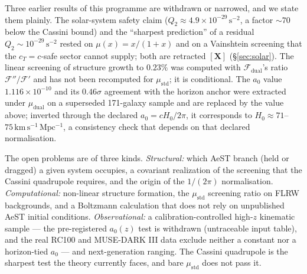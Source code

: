 \documentclass[aps,prd,preprint,superscriptaddress,nofootinbib,amsmath,amssymb,floatfix]{revtex4-2}
\makeatletter
\DeclareRobustCommand{\_}{%
    \ifmmode\nfss@text{\textunderscore}\else\textunderscore\penalty\z@\fi}%
\makeatother
\begin{document}
Three earlier results of this programme are withdrawn or narrowed, and we state them plainly. The solar-system safety claim ($Q_2 \approx 4.9\times10^{-29}\,\mathrm{s^{-2}}$, a factor $\sim70$ below the Cassini bound) and the ``sharpest prediction'' of a residual $Q_2 \sim 10^{-29}\,\mathrm{s^{-2}}$ rested on $\mu(x) = x/(1+x)$ and on a Vainshtein screening that the $c_T = c$-safe sector cannot supply; both are retracted $\mathbf{[X]}$ (\S\ref{sec:solar}). The linear screening of structure growth to $0.23\%$ was computed with $\mathcal{F}_{\text{dual}}$'s ratio $\mathcal{F}''/\mathcal{F}'$ and has not been recomputed for $\mu_{\text{std}}$; it is conditional. The $a_0$ value $1.116\times10^{-10}$ and its $0.46\sigma$ agreement with the horizon anchor were extracted under $\mu_{\text{dual}}$ on a superseded 171-galaxy sample and are replaced by the value above; inverted through the declared $a_0 = cH_0/2\pi$, it corresponds to $H_0 \approx 71$--$75\,\mathrm{km\,s^{-1}\,Mpc^{-1}}$, a consistency check that depends on that declared normalisation.

The open problems are of three kinds. \emph{Structural:} which AeST branch (held or dragged) a given system occupies, a covariant realization of the screening that the Cassini quadrupole requires, and the origin of the $1/(2\pi)$ normalisation. \emph{Computational:} non-linear structure formation, the $\mu_{\text{std}}$ screening ratio on FLRW backgrounds, and a Boltzmann calculation that does not rely on unpublished AeST initial conditions. \emph{Observational:} a calibration-controlled high-$z$ kinematic sample --- the pre-registered $a_0(z)$ test is withdrawn (untraceable input table), and the real RC100 and MUSE-DARK III data exclude neither a constant nor a horizon-tied $a_0$ --- and next-generation ranging. The Cassini quadrupole is the sharpest test the theory currently faces, and bare $\mu_{\text{std}}$ does not pass it.
\end{document}
